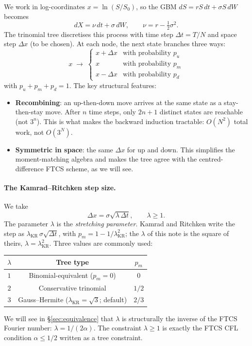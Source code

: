 \documentclass[11pt,a4paper]{article}
\begin{document}
We work in log-coordinates $x = \ln(S/S_0)$, so the GBM
$dS = rS\,dt + \sigma S\,dW$ becomes
\[
dX = \nu\,dt + \sigma\,dW, \qquad \nu = r - \tfrac{1}{2}\sigma^2.
\]
The trinomial tree discretises this process with time step $\Delta t = T/N$
and space step $\Delta x$ (to be chosen). At each node, the next
state branches three ways:
\[
x \;\longrightarrow\;
\begin{cases}
x + \Delta x & \text{with probability } p_u \\
x           & \text{with probability } p_m \\
x - \Delta x & \text{with probability } p_d
\end{cases}
\]
with $p_u + p_m + p_d = 1$. The key structural features:
\begin{itemize}[leftmargin=2em]
\item \textbf{Recombining}: an up-then-down move arrives at the same
state as a stay-then-stay move. After $n$ time steps, only $2n+1$
distinct states are reachable (not $3^n$). This is what makes the
backward induction tractable: $O(N^2)$ total work, not $O(3^N)$.
\item \textbf{Symmetric in space}: the same $\Delta x$ for up and
down. This simplifies the moment-matching algebra and makes the tree
agree with the centred-difference FTCS scheme, as we will
see.
\end{itemize}

\paragraph{The Kamrad--Ritchken step size.} We take
\begin{equation}
\Delta x = \sigma\sqrt{\lambda\,\Delta t}, \qquad \lambda \ge 1.
\label{eq:kr-step}
\end{equation}
The parameter $\lambda$ is the \emph{stretching parameter}. Kamrad
and Ritchken write the step as
$\lambda_{\mathrm{KR}}\,\sigma\sqrt{\Delta t}$, with
$p_m = 1 - 1/\lambda_{\mathrm{KR}}^2$; the $\lambda$ of this note is
the square of theirs, $\lambda = \lambda_{\mathrm{KR}}^2$.
Three values are commonly used:
\begin{center}
\begin{tabular}{ccc}
\hline
$\lambda$ & Tree type & $p_m$ \\
\hline
$1$ & Binomial-equivalent ($p_m = 0$) & $0$ \\
$2$ & Conservative trinomial          & $1/2$ \\
$3$ & Gauss--Hermite ($\lambda_{\mathrm{KR}} = \sqrt{3}$; default) & $2/3$ \\
\hline
\end{tabular}
\end{center}
We will see in \S\ref{sec:equivalence} that $\lambda$ is structurally
the inverse of the FTCS Fourier number: $\lambda = 1/(2\alpha)$.
The constraint $\lambda \ge 1$ is exactly the FTCS CFL condition
$\alpha \le 1/2$ written as a tree constraint.
\end{document}
